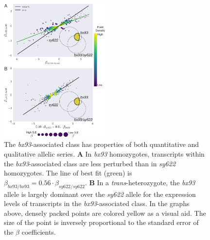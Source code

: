 \documentclass[10pt, twocolumn]{article}
\begin{document}
\begin{figure}
  \centering{}
  \includegraphics[width=0.5\textwidth]{../figs/bx93_associated_analysis.pdf}
  \caption{The \emph{bx93}-associated class has properties of both quantitative
    and qualitative allelic series.
    \textbf{A} In \emph{bx93}
    homozygotes, transcripts within the \emph{bx93}-associated class are
    less perturbed than in \emph{sy622}
    homozygotes. The line of best fit (green) is
    $\beta_{bx93/bx93}=0.56\cdot\beta_{sy622/sy622}$.
    \textbf{B} In a \emph{trans}-heterozygote, the \emph{bx93} allele is largely
    dominant over the \emph{sy622} allele for the expression levels of
    transcripts in the \emph{bx93}-associated class.
    In the graphs above, densely packed points are colored yellow as a visual
    aid. The size of the point is inversely proportional to the standard error
    of the $\beta$ coefficients.
    }
\label{fig:bx93_associated}
\end{figure}

\end{document}

